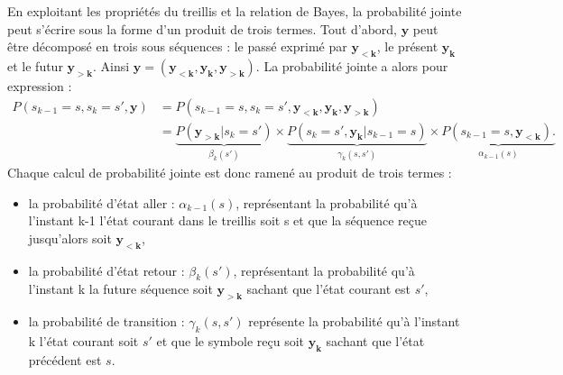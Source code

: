 En exploitant les propriétés du treillis et la relation de Bayes, la probabilité jointe peut s'écrire sous la forme d'un 
produit de trois termes. Tout d'abord, $\mathbf{y}$ peut être décomposé en trois sous séquences : le passé exprimé par 
$\mathbf{y_{<k}}$, le présent $\mathbf{y_k}$ et le futur $\mathbf{y_{>k}}$. Ainsi $\mathbf{y} = (\mathbf{y_{<k}}, \mathbf{y_k}, \mathbf{y_{>k}}).$ 
La probabilité jointe a alors pour expression : 
\begin{align*}
	P(s_{k-1}=s, s_{k}=s',\mathbf{y}) & = P(s_{k-1}=s, s_{k}=s',\mathbf{y_{<k}},\mathbf{y_{k}},\mathbf{y_{>k}})                                                                                                                              \\
	                                  & = \underbrace{P(\mathbf{y_{>k}}|s_{k}=s')}_{\beta_k(s')}\times \underbrace{P(s_{k}=s',\mathbf{y_{k}}|s_{k-1}=s)}_{\gamma_k(s,s')}\times \underbrace{P(s_{k-1}=s,\mathbf{y_{<k}}).}_{\alpha_{k-1}(s)} 
\end{align*}
Chaque calcul de probabilité jointe est donc ramené au produit de trois termes :
\begin{itemize}
	\item la probabilité d'état aller : $\alpha_{k-1}(s)$, représentant la probabilité qu'à l'instant k-1 l'état courant 
	dans le treillis soit s et que la séquence reçue jusqu'alors soit $\mathbf{y_{<k}}$,
	\item la probabilité d'état retour : $\beta_k(s')$, représentant la probabilité qu'à l'instant k la future séquence 
	soit $\mathbf{y_{>k}}$ sachant que l'état courant est $s'$,
	\item la probabilité de transition : $\gamma_k(s,s')$ représente la probabilité qu'à l'instant k l'état courant soit 
	$s'$ et que le symbole reçu soit $\mathbf{y_k}$ sachant que l'état précédent est $s$.
\end{itemize}
